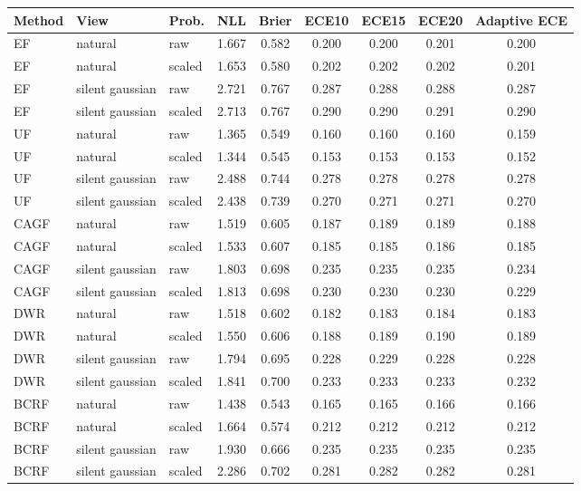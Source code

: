 \begin{tabular}{lllcccccc}
\toprule
Method & View & Prob. & NLL & Brier & ECE10 & ECE15 & ECE20 & Adaptive ECE \\
\midrule
EF & natural & raw & 1.667 & 0.582 & 0.200 & 0.200 & 0.201 & 0.200 \\
EF & natural & scaled & 1.653 & 0.580 & 0.202 & 0.202 & 0.202 & 0.201 \\
EF & silent gaussian & raw & 2.721 & 0.767 & 0.287 & 0.288 & 0.288 & 0.287 \\
EF & silent gaussian & scaled & 2.713 & 0.767 & 0.290 & 0.290 & 0.291 & 0.290 \\
UF & natural & raw & 1.365 & 0.549 & 0.160 & 0.160 & 0.160 & 0.159 \\
UF & natural & scaled & 1.344 & 0.545 & 0.153 & 0.153 & 0.153 & 0.152 \\
UF & silent gaussian & raw & 2.488 & 0.744 & 0.278 & 0.278 & 0.278 & 0.278 \\
UF & silent gaussian & scaled & 2.438 & 0.739 & 0.270 & 0.271 & 0.271 & 0.270 \\
CAGF & natural & raw & 1.519 & 0.605 & 0.187 & 0.189 & 0.189 & 0.188 \\
CAGF & natural & scaled & 1.533 & 0.607 & 0.185 & 0.185 & 0.186 & 0.185 \\
CAGF & silent gaussian & raw & 1.803 & 0.698 & 0.235 & 0.235 & 0.235 & 0.234 \\
CAGF & silent gaussian & scaled & 1.813 & 0.698 & 0.230 & 0.230 & 0.230 & 0.229 \\
DWR & natural & raw & 1.518 & 0.602 & 0.182 & 0.183 & 0.184 & 0.183 \\
DWR & natural & scaled & 1.550 & 0.606 & 0.188 & 0.189 & 0.190 & 0.189 \\
DWR & silent gaussian & raw & 1.794 & 0.695 & 0.228 & 0.229 & 0.228 & 0.228 \\
DWR & silent gaussian & scaled & 1.841 & 0.700 & 0.233 & 0.233 & 0.233 & 0.232 \\
BCRF & natural & raw & 1.438 & 0.543 & 0.165 & 0.165 & 0.166 & 0.166 \\
BCRF & natural & scaled & 1.664 & 0.574 & 0.212 & 0.212 & 0.212 & 0.212 \\
BCRF & silent gaussian & raw & 1.930 & 0.666 & 0.235 & 0.235 & 0.235 & 0.235 \\
BCRF & silent gaussian & scaled & 2.286 & 0.702 & 0.281 & 0.282 & 0.282 & 0.281 \\
\bottomrule
\end{tabular}
